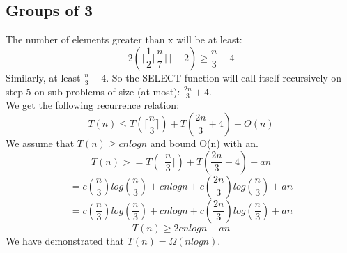 \subsection*{Groups of 3}
The number of elements greater than x will be at least:
\begin{equation*}
	2(\lceil \frac{1}{2} \lceil \frac{n}{7} \rceil \rceil -2) \geq \frac{n}{3} - 4
\end{equation*}
Similarly, at least $\frac{n}{3} - 4$. So the SELECT function will call itself recursively on step 5 on sub-problems of size (at most): $\frac{2n}{3} + 4$.\\
We get the following recurrence relation:
\begin{equation*}
	T(n) \leq T(\lceil \frac{n}{3} \rceil) + T(\frac{2n}{3} + 4) + O(n)
\end{equation*}
We assume that $T(n) \geq cnlogn$ and bound O(n) with an.
\begin{equation*}
	T(n) >=  T(\lceil \frac{n}{3} \rceil) + T(\frac{2n}{3} + 4) + an
\end{equation*}
\begin{equation*}
	= c(\frac{n}{3})log(\frac{n}{3}) + cnlogn+ c(\frac{2n}{3})log(\frac{n}{3}) + an
\end{equation*}
\begin{equation*}
	= c(\frac{n}{3})log(\frac{n}{3}) + cnlogn+ c(\frac{2n}{3})log(\frac{n}{3}) + an
\end{equation*}
\begin{equation*}
	T(n) \geq 2cnlogn + an 
\end{equation*}	
We have demonstrated that  $T(n) = \Omega(nlogn)$.